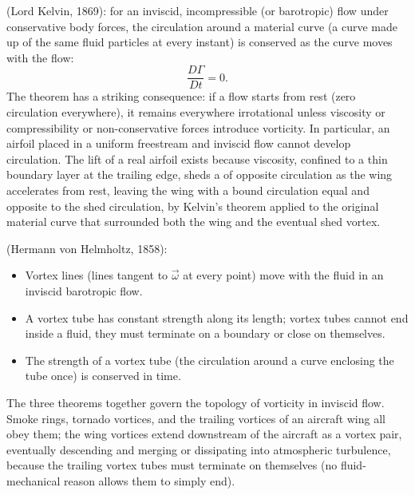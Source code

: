  (Lord Kelvin, 1869): for an
inviscid, incompressible (or barotropic) flow under conservative
body forces, the circulation around a material curve (a curve made
up of the same fluid particles at every instant) is conserved as
the curve moves with the flow:
\[
\frac{D\Gamma}{Dt} = 0.
\]
The theorem has a striking consequence: if a flow starts from rest
(zero circulation everywhere), it remains everywhere irrotational
unless viscosity or compressibility or non-conservative forces
introduce vorticity. In particular, an airfoil placed in a uniform
freestream and inviscid flow cannot develop circulation. The lift
of a real airfoil exists because viscosity, confined to a thin
boundary layer at the trailing edge, sheds a  of opposite circulation as the wing accelerates from rest,
leaving the wing with a bound circulation equal and opposite to the
shed circulation, by Kelvin's theorem applied to the original
material curve that surrounded both the wing and the eventual shed
vortex.

 (Hermann von Helmholtz,
1858):

\begin{itemize}[leftmargin=*]
  \item Vortex lines (lines tangent to $\vec{\omega}$ at every
    point) move with the fluid in an inviscid barotropic flow.
  \item A vortex tube has constant strength along its length;
    vortex tubes cannot end inside a fluid, they must terminate
    on a boundary or close on themselves.
  \item The strength of a vortex tube (the circulation around a
    curve enclosing the tube once) is conserved in time.
\end{itemize}

The three theorems together govern the topology of vorticity in
inviscid flow. Smoke rings, tornado vortices, and the trailing
vortices of an aircraft wing all obey them; the wing vortices
extend downstream of the aircraft as a vortex pair, eventually
descending and merging or dissipating into atmospheric turbulence,
because the trailing vortex tubes must terminate on themselves
(no fluid-mechanical reason allows them to simply end).

